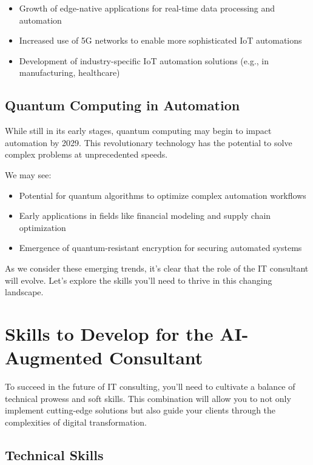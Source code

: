 \begin{itemize}
    \item Growth of edge-native applications for real-time data processing and automation
    \item Increased use of 5G networks to enable more sophisticated IoT automations
    \item Development of industry-specific IoT automation solutions (e.g., in manufacturing, healthcare)
\end{itemize}

\subsection{Quantum Computing in Automation}

While still in its early stages, quantum computing may begin to impact automation by 2029. This revolutionary technology has the potential to solve complex problems at unprecedented speeds.

We may see:

\begin{itemize}
    \item Potential for quantum algorithms to optimize complex automation workflows
    \item Early applications in fields like financial modeling and supply chain optimization
    \item Emergence of quantum-resistant encryption for securing automated systems
\end{itemize}

As we consider these emerging trends, it's clear that the role of the IT consultant will evolve. Let's explore the skills you'll need to thrive in this changing landscape.

\section{Skills to Develop for the AI-Augmented Consultant}

To succeed in the future of IT consulting, you'll need to cultivate a balance of technical prowess and soft skills. This combination will allow you to not only implement cutting-edge solutions but also guide your clients through the complexities of digital transformation.

\subsection{Technical Skills}

